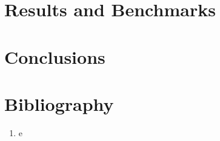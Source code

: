 \documentclass[12pt]{article}
\numberwithin{equation}{section}
\begin{document}
\section{Results and Benchmarks}
\label{sec:results}

\section{Conclusions}
\label{sec:conclusions}

\section{Bibliography}
\label{sec:bib}

\begin{enumerate}

\item e

\end{enumerate}
\end{document}

